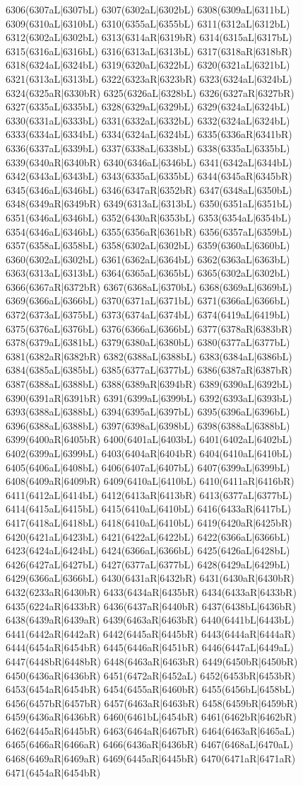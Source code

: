 6306(6307aL|6307bL) 6307(6302aL|6302bL) 6308(6309aL|6311bL) 6309(6310aL|6310bL) 6310(6355aL|6355bL) 6311(6312aL|6312bL) 6312(6302aL|6302bL) 6313(6314aR|6319bR) 6314(6315aL|6317bL) 6315(6316aL|6316bL) 6316(6313aL|6313bL) 6317(6318aR|6318bR) 6318(6324aL|6324bL) 6319(6320aL|6322bL) 6320(6321aL|6321bL) 6321(6313aL|6313bL) 6322(6323aR|6323bR) 6323(6324aL|6324bL) 6324(6325aR|6330bR) 6325(6326aL|6328bL) 6326(6327aR|6327bR) 6327(6335aL|6335bL) 6328(6329aL|6329bL) 6329(6324aL|6324bL) 6330(6331aL|6333bL) 6331(6332aL|6332bL) 6332(6324aL|6324bL) 6333(6334aL|6334bL) 6334(6324aL|6324bL) 6335(6336aR|6341bR) 6336(6337aL|6339bL) 6337(6338aL|6338bL) 6338(6335aL|6335bL) 6339(6340aR|6340bR) 6340(6346aL|6346bL) 6341(6342aL|6344bL) 6342(6343aL|6343bL) 6343(6335aL|6335bL) 6344(6345aR|6345bR) 6345(6346aL|6346bL) 6346(6347aR|6352bR) 6347(6348aL|6350bL) 6348(6349aR|6349bR) 6349(6313aL|6313bL) 6350(6351aL|6351bL) 6351(6346aL|6346bL) 6352(6430aR|6353bL) 6353(6354aL|6354bL) 6354(6346aL|6346bL) 6355(6356aR|6361bR) 6356(6357aL|6359bL) 6357(6358aL|6358bL) 6358(6302aL|6302bL) 6359(6360aL|6360bL) 6360(6302aL|6302bL) 6361(6362aL|6364bL) 6362(6363aL|6363bL) 6363(6313aL|6313bL) 6364(6365aL|6365bL) 6365(6302aL|6302bL) 6366(6367aR|6372bR) 6367(6368aL|6370bL) 6368(6369aL|6369bL) 6369(6366aL|6366bL) 6370(6371aL|6371bL) 6371(6366aL|6366bL) 6372(6373aL|6375bL) 6373(6374aL|6374bL) 6374(6419aL|6419bL) 6375(6376aL|6376bL) 6376(6366aL|6366bL) 6377(6378aR|6383bR) 6378(6379aL|6381bL) 6379(6380aL|6380bL) 6380(6377aL|6377bL) 6381(6382aR|6382bR) 6382(6388aL|6388bL) 6383(6384aL|6386bL) 6384(6385aL|6385bL) 6385(6377aL|6377bL) 6386(6387aR|6387bR) 6387(6388aL|6388bL) 6388(6389aR|6394bR) 6389(6390aL|6392bL) 6390(6391aR|6391bR) 6391(6399aL|6399bL) 6392(6393aL|6393bL) 6393(6388aL|6388bL) 6394(6395aL|6397bL) 6395(6396aL|6396bL) 6396(6388aL|6388bL) 6397(6398aL|6398bL) 6398(6388aL|6388bL) 6399(6400aR|6405bR) 6400(6401aL|6403bL) 6401(6402aL|6402bL) 6402(6399aL|6399bL) 6403(6404aR|6404bR) 6404(6410aL|6410bL) 6405(6406aL|6408bL) 6406(6407aL|6407bL) 6407(6399aL|6399bL) 6408(6409aR|6409bR) 6409(6410aL|6410bL) 6410(6411aR|6416bR) 6411(6412aL|6414bL) 6412(6413aR|6413bR) 6413(6377aL|6377bL) 6414(6415aL|6415bL) 6415(6410aL|6410bL) 6416(6433aR|6417bL) 6417(6418aL|6418bL) 6418(6410aL|6410bL) 6419(6420aR|6425bR) 6420(6421aL|6423bL) 6421(6422aL|6422bL) 6422(6366aL|6366bL) 6423(6424aL|6424bL) 6424(6366aL|6366bL) 6425(6426aL|6428bL) 6426(6427aL|6427bL) 6427(6377aL|6377bL) 6428(6429aL|6429bL) 6429(6366aL|6366bL) 6430(6431aR|6432bR) 6431(6430aR|6430bR) 6432(6233aR|6430bR) 6433(6434aR|6435bR) 6434(6433aR|6433bR) 6435(6224aR|6433bR) 6436(6437aR|6440bR) 6437(6438bL|6436bR) 6438(6439aR|6439aR) 6439(6463aR|6463bR) 6440(6441bL|6443bL) 6441(6442aR|6442aR) 6442(6445aR|6445bR) 6443(6444aR|6444aR) 6444(6454aR|6454bR) 6445(6446aR|6451bR) 6446(6447aL|6449aL) 6447(6448bR|6448bR) 6448(6463aR|6463bR) 6449(6450bR|6450bR) 6450(6436aR|6436bR) 6451(6472aR|6452aL) 6452(6453bR|6453bR) 6453(6454aR|6454bR) 6454(6455aR|6460bR) 6455(6456bL|6458bL) 6456(6457bR|6457bR) 6457(6463aR|6463bR) 6458(6459bR|6459bR) 6459(6436aR|6436bR) 6460(6461bL|6454bR) 6461(6462bR|6462bR) 6462(6445aR|6445bR) 6463(6464aR|6467bR) 6464(6463aR|6465aL) 6465(6466aR|6466aR) 6466(6436aR|6436bR) 6467(6468aL|6470aL) 6468(6469aR|6469aR) 6469(6445aR|6445bR) 6470(6471aR|6471aR) 6471(6454aR|6454bR) 